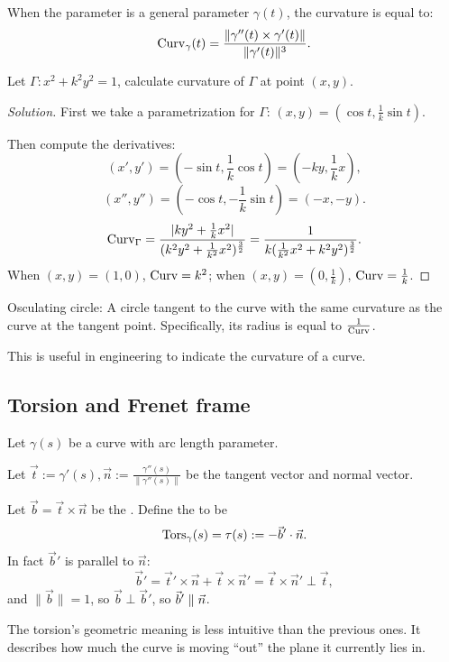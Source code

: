 \begin{proposition}
    When the parameter is a general parameter $\gamma(t)$, the curvature is equal to:
	\[
	\operatorname{Curv}_\gamma(t) = \frac{\lVert\gamma''(t) \times \gamma'(t)\rVert}
	{\lVert\gamma'(t)\rVert^3}.
	\]
\end{proposition}
\begin{example}
    Let $\Gamma: x^2+k^2y^2 = 1$, calculate curvature of $\Gamma$ at point $(x,y)$.
\end{example}
\begin{proof}[Solution]
    First we take a parametrization for $\Gamma$:
	$(x, y) = (\cos t, \frac{1}{k}\sin t)$.

	Then compute the derivatives:
	\[(x', y') = (-\sin t, \frac{1}{k}\cos t) = (-ky, \frac{1}{k}x),\]
	\[(x'', y'') = (-\cos t,-\frac{1}{k}\sin t) = (-x, -y).\]
	\[
	\operatorname{Curv}_\Gamma = \frac{|ky^2 + \frac{1}{k}x^2|}
	{(k^2y^2+\frac{1}{k^2}x^2)^{\frac{3}{2}}}
	= \frac{1}{k(\frac{1}{k^2}x^2 + k^2y^2)^{\frac{3}{2}}}.
	\]
	When $(x,y)=(1,0)$,  $\operatorname{Curv} = k^2$; when $(x,y)=(0,\frac{1}{k})$,
	$\operatorname{Curv} = \frac{1}{k}$.
\end{proof}
\begin{remark}
    Osculating circle: A circle tangent to the curve with
	the same curvature as the curve at the tangent point.
	Specifically, its radius is equal to $\frac{1}{\operatorname{Curv}}$.

	This is useful in engineering to indicate the curvature
	of a curve.
\end{remark}

\subsection{Torsion and Frenet frame}
\label{sub:Torsion and Frenet frame}
\begin{definition}[Torsion]
	Let $\gamma(s)$ be a curve with arc length parameter.

	Let $\vec{t}:=\gamma'(s), \vec{n}:=\frac{\gamma''(s)}{\lVert\gamma''(s)\rVert}$
	be the tangent vector and normal vector.

	Let $\vec{b} = \vec{t}\times \vec{n}$ be the .
	Define the  to be
	\[
	\operatorname{Tors}_\gamma(s) = \tau(s) := - \vec{b}' \cdot \vec{n}.
	\]
	In fact $\vec{b}'$ is parallel to $\vec{n}$:
	\[
	\vec{b}'= \vec{t}'\times \vec{n} + \vec{t}\times \vec{n}'
	= \vec{t}\times\vec{n}'\perp\vec{t},
	\]
	and $\lVert \vec{b}\rVert = 1$, so $\vec{b}\perp\vec{b}'$,
	so $\vec{b}' \parallel \vec{n}$.
\end{definition}

The torsion's geometric meaning is less intuitive than the previous ones.
It describes how much the curve is moving ``out'' the plane it currently
lies in.
